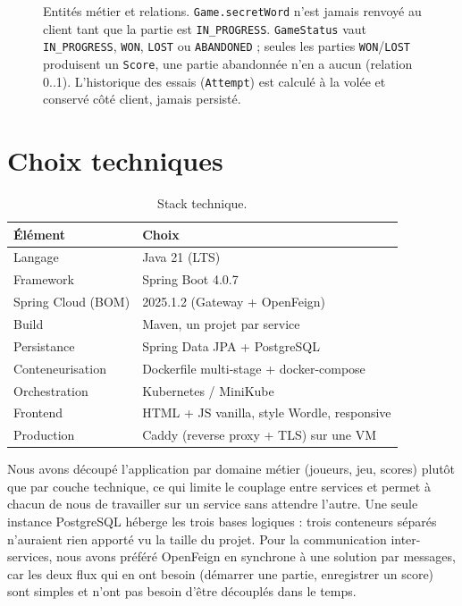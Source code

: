 \documentclass[11pt,a4paper]{article}
\begin{document}
\begin{figure}[h]
\caption{Entités métier et relations. \texttt{Game.secretWord} n'est jamais renvoyé au
client tant que la partie est \texttt{IN\_PROGRESS}. \texttt{GameStatus} vaut
\texttt{IN\_PROGRESS}, \texttt{WON}, \texttt{LOST} ou \texttt{ABANDONED} ; seules les
parties \texttt{WON}/\texttt{LOST} produisent un \texttt{Score}, une partie abandonnée
n'en a aucun (relation 0..1). L'historique des essais (\texttt{Attempt}) est calculé à
la volée et conservé côté client, jamais persisté.}
\end{figure}

\section{Choix techniques}
\begin{table}[h]
\centering
\small
\begin{tabular}{@{}ll@{}}
\toprule
\textbf{Élément} & \textbf{Choix} \\
\midrule
Langage           & Java 21 (LTS) \\
Framework         & Spring Boot 4.0.7 \\
Spring Cloud (BOM) & 2025.1.2 (Gateway + OpenFeign) \\
Build             & Maven, un projet par service \\
Persistance       & Spring Data JPA + PostgreSQL \\
Conteneurisation  & Dockerfile multi-stage + docker-compose \\
Orchestration     & Kubernetes / MiniKube \\
Frontend          & HTML + JS vanilla, style Wordle, responsive \\
Production        & Caddy (reverse proxy + TLS) sur une VM \\
\bottomrule
\end{tabular}
\caption{Stack technique.}
\end{table}

Nous avons découpé l'application par domaine métier (joueurs, jeu, scores) plutôt que
par couche technique, ce qui limite le couplage entre services et permet à chacun de
nous de travailler sur un service sans attendre l'autre. Une seule instance
PostgreSQL héberge les trois bases logiques : trois conteneurs séparés n'auraient rien
apporté vu la taille du projet. Pour la communication inter-services, nous avons
préféré OpenFeign en synchrone à une solution par messages, car les deux flux qui en
ont besoin (démarrer une partie, enregistrer un score) sont simples et n'ont pas
besoin d'être découplés dans le temps.
\end{document}
